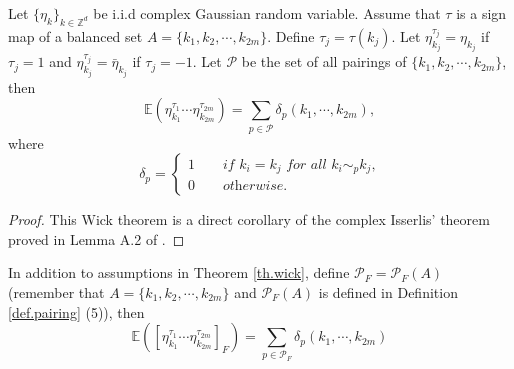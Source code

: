 
 \begin{thm}\label{th.wick}
 Let $\{\eta_k\}_{k\in\mathbb{Z}^d}$ be i.i.d complex Gaussian random variable. Assume that $\tau$ is a sign map of a balanced set $A=\{k_1,k_2,\cdots,k_{2m}\}$. Define $\tau_{j}=\tau(k_j)$. Let $\eta_{k_j}^{\tau_j}=\eta_{k_j}$ if $\tau_j=1$ and $\eta_{k_j}^{\tau_j}=\bar{\eta}_{k_j}$ if $\tau_j=-1$. %
 Let $\mathcal{P}$ be the set of all pairings of $\{k_1,k_2,\cdots,k_{2m}\}$, then
 \begin{equation}
  \mathbb{E}(\eta^{\tau_1}_{k_1}\cdots \eta^{\tau_{2m}}_{k_{2m}})=\sum_{p\in \mathcal{P}} \delta_{p}(k_1,\cdots,k_{2m}), 
 \end{equation}
 where 
 \begin{equation}\label{eq.deltapairing}
 \delta_{p}=\begin{cases}
 1\qquad \textit{if $k_{i}=k_{j}$ for all $k_{i}\sim_{p}k_{j}$,}
 \\
 0\qquad \textit{otherwise.}
 \end{cases}
 \end{equation}
 \end{thm}
 \begin{proof}
 This Wick theorem is a direct corollary of the complex Isserlis' theorem proved in Lemma A.2 of \cite{deng2021full}.
 \end{proof}
 
 \begin{thm}\label{th.wickr} In addition to assumptions in Theorem \ref{th.wick}, define $\mathcal{P}_F=\mathcal{P}_F(A)$ (remember that $A=\{k_1,k_2,\cdots,k_{2m}\}$ and $\mathcal{P}_F(A)$ is defined in Definition \ref{def.pairing} (5)), then 
 \begin{equation}
  \mathbb{E}([\eta^{\tau_1}_{k_1}\cdots \eta^{\tau_{2m}}_{k_{2m}}]_F)=\sum_{p\in \mathcal{P}_F} \delta_{p}(k_1,\cdots,k_{2m})
 \end{equation}
 \end{thm}
 
